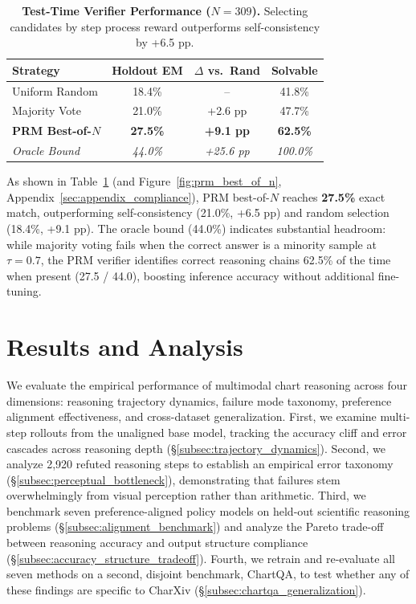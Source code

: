 \documentclass[11pt]{article}
\begin{document}
\begin{table}[t]
\centering
\footnotesize
\setlength{\tabcolsep}{2.6pt}
\begin{tabular}{lccc}
\toprule
\textbf{Strategy} & \textbf{Holdout EM} & \textbf{$\Delta$ vs.\ Rand} & \textbf{Solvable} \\
\midrule
Uniform Random & 18.4\% & -- & 41.8\% \\
Majority Vote & 21.0\% & +2.6 pp & 47.7\% \\
\textbf{PRM Best-of-$N$} & \textbf{27.5\%} & \textbf{+9.1 pp} & \textbf{62.5\%} \\
\midrule
\textit{Oracle Bound} & \textit{44.0\%} & \textit{+25.6 pp} & \textit{100.0\%} \\
\bottomrule
\end{tabular}
\caption{\textbf{Test-Time Verifier Performance ($N=309$).} Selecting candidates by step process reward outperforms self-consistency by +6.5 pp.}
\label{tab:best_of_n}
\end{table}

As shown in Table~\ref{tab:best_of_n} (and Figure~\ref{fig:prm_best_of_n}, Appendix~\ref{sec:appendix_compliance}), PRM best-of-$N$ reaches \textbf{27.5\%} exact match, outperforming self-consistency (21.0\%, +6.5 pp) and random selection (18.4\%, +9.1 pp). The oracle bound (44.0\%) indicates substantial headroom: while majority voting fails when the correct answer is a minority sample at $\tau = 0.7$, the PRM verifier identifies correct reasoning chains 62.5\% of the time when present (27.5 / 44.0), boosting inference accuracy without additional fine-tuning.


\section{Results and Analysis}
\label{sec:results_analysis}

We evaluate the empirical performance of multimodal chart reasoning across four dimensions: reasoning trajectory dynamics, failure mode taxonomy, preference alignment effectiveness, and cross-dataset generalization. First, we examine multi-step rollouts from the unaligned base model, tracking the accuracy cliff and error cascades across reasoning depth (\S\ref{subsec:trajectory_dynamics}). Second, we analyze 2,920 refuted reasoning steps to establish an empirical error taxonomy (\S\ref{subsec:perceptual_bottleneck}), demonstrating that failures stem overwhelmingly from visual perception rather than arithmetic. Third, we benchmark seven preference-aligned policy models on held-out scientific reasoning problems (\S\ref{subsec:alignment_benchmark}) and analyze the Pareto trade-off between reasoning accuracy and output structure compliance (\S\ref{subsec:accuracy_structure_tradeoff}). Fourth, we retrain and re-evaluate all seven methods on a second, disjoint benchmark, ChartQA, to test whether any of these findings are specific to CharXiv (\S\ref{subsec:chartqa_generalization}).
\end{document}
